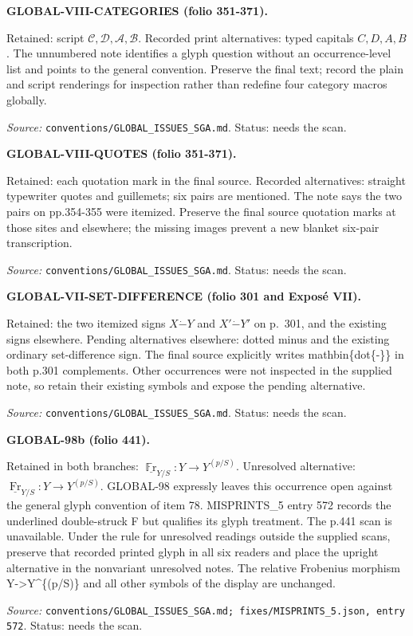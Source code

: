 \medskip\noindent\textbf{GLOBAL-VIII-CATEGORIES (folio 351-371).}\par
Retained: script $\mathcal{C},\mathcal{D},\mathcal{A},\mathcal{B}$. Recorded print alternatives: typed capitals $C,D,A,B$.
The unnumbered note identifies a glyph question without an occurrence-level list and points to the general convention. Preserve the final text; record the plain and script renderings for inspection rather than redefine four category macros globally.
\par\noindent\textit{Source: }\texttt{conventions/GLOBAL\_ISSUES\_SGA.md}. Status: needs the scan.

\medskip\noindent\textbf{GLOBAL-VIII-QUOTES (folio 351-371).}\par
Retained: each quotation mark in the final source. Recorded alternatives: straight typewriter quotes and guillemets; six pairs are mentioned.
The note says the two pairs on pp.354-355 were itemized. Preserve the final source quotation marks at those sites and elsewhere; the missing images prevent a new blanket six-pair transcription.
\par\noindent\textit{Source: }\texttt{conventions/GLOBAL\_ISSUES\_SGA.md}. Status: needs the scan.

\medskip\noindent\textbf{GLOBAL-VII-SET-DIFFERENCE (folio 301 and Exposé VII).}\par
Retained: the two itemized signs $X\mathbin{\dot{-}}Y$ and $X'\mathbin{\dot{-}}Y'$ on p.~301, and the existing signs elsewhere. Pending alternatives elsewhere: dotted minus and the existing ordinary set-difference sign.
The final source explicitly writes mathbin\{dot\{-\}\} in both p.301 complements. Other occurrences were not inspected in the supplied note, so retain their existing symbols and expose the pending alternative.
\par\noindent\textit{Source: }\texttt{conventions/GLOBAL\_ISSUES\_SGA.md}. Status: needs the scan.

\medskip\noindent\textbf{GLOBAL-98b (folio 441).}\par
Retained in both branches: $\underline{\operatorname{\mathbb{F}r}}_{Y/S}:Y\longrightarrow Y^{(p/S)}$. Unresolved alternative: $\underline{\operatorname{Fr}}_{Y/S}:Y\longrightarrow Y^{(p/S)}$.
GLOBAL-98 expressly leaves this occurrence open against the general glyph convention of item 78. MISPRINTS\_5 entry 572 records the underlined double-struck F but qualifies its glyph treatment. The p.441 scan is unavailable. Under the rule for unresolved readings outside the supplied scans, preserve that recorded printed glyph in all six readers and place the upright alternative in the nonvariant unresolved notes. The relative Frobenius morphism Y->Y\textasciicircum{}\{(p/S)\} and all other symbols of the display are unchanged.
\par\noindent\textit{Source: }\texttt{conventions/GLOBAL\_ISSUES\_SGA.md; fixes/MISPRINTS\_5.json, entry 572}. Status: needs the scan.
\endgroup
\clearpage
